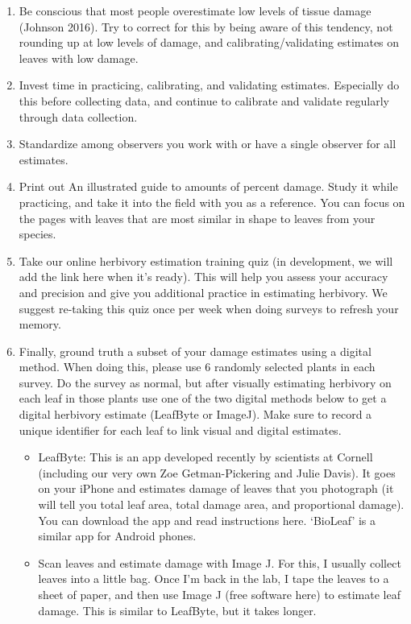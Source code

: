 \documentclass[
  letterpaper,
  DIV=11,
  numbers=noendperiod]{scrreprt}
\begin{document}
\begin{enumerate}
\def\labelenumi{\arabic{enumi}.}
\item
  Be conscious that most people overestimate low levels of tissue damage
  (Johnson 2016). Try to correct for this by being aware of this
  tendency, not rounding up at low levels of damage, and
  calibrating/validating estimates on leaves with low damage.
\item
  Invest time in practicing, calibrating, and validating estimates.
  Especially do this before collecting data, and continue to calibrate
  and validate regularly through data collection.
\item
  Standardize among observers you work with or have a single observer
  for all estimates.
\item
  Print out An illustrated guide to amounts of percent damage. Study it
  while practicing, and take it into the field with you as a reference.
  You can focus on the pages with leaves that are most similar in shape
  to leaves from your species.
\item
  Take our online herbivory estimation training quiz (in development, we
  will add the link here when it's ready). This will help you assess
  your accuracy and precision and give you additional practice in
  estimating herbivory. We suggest re-taking this quiz once per week
  when doing surveys to refresh your memory.
\item
  Finally, ground truth a subset of your damage estimates using a
  digital method. When doing this, please use 6 randomly selected plants
  in each survey. Do the survey as normal, but after visually estimating
  herbivory on each leaf in those plants use one of the two digital
  methods below to get a digital herbivory estimate (LeafByte or
  ImageJ). Make sure to record a unique identifier for each leaf to link
  visual and digital estimates.

  \begin{itemize}
  \item
    LeafByte: This is an app developed recently by scientists at Cornell
    (including our very own Zoe Getman-Pickering and Julie Davis). It
    goes on your iPhone and estimates damage of leaves that you
    photograph (it will tell you total leaf area, total damage area, and
    proportional damage). You can download the app and read instructions
    here. `BioLeaf' is a similar app for Android phones.
  \item
    Scan leaves and estimate damage with Image J. For this, I usually
    collect leaves into a little bag. Once I'm back in the lab, I tape
    the leaves to a sheet of paper, and then use Image J (free software
    here) to estimate leaf damage. This is similar to LeafByte, but it
    takes longer.
  \end{itemize}
\end{enumerate}
\end{document}

